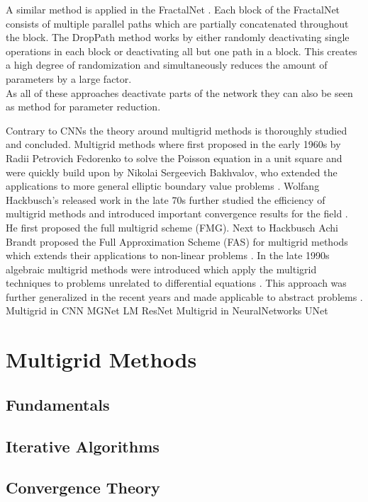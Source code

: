 \documentclass[a4paper,12pt,titlepage,enabledeprecatedfontcommands]{scrreprt}
\begin{document}
A similar method is applied in the FractalNet \cite{DBLP:journals/corr/LarssonMS16a}. Each block of the FractalNet consists of multiple parallel paths which are partially concatenated throughout the block. The DropPath method works by either randomly deactivating single operations in each block or deactivating all but one path in a block. This creates a high degree of randomization and simultaneously reduces the amount of parameters by a large factor. \\
As all of these approaches deactivate parts of the network they can also be seen as method for parameter reduction.

Contrary to CNNs the theory around multigrid methods is thoroughly studied and concluded.
Multigrid methods where first proposed in the early 1960s by Radii Petrovich Fedorenko to solve the Poisson equation in a unit square \cite{FEDORENKO19621092,FEDORENKO1964227} and were quickly build upon by Nikolai Sergeevich Bakhvalov, who extended the applications to more general elliptic boundary value problems \cite{BAKHVALOV1966101}. Wolfang Hackbusch's released work in the late 70s further studied the efficiency of multigrid methods and introduced important convergence results for the field \cite{Hackbusch1977}. He first proposed the full multigrid scheme (FMG). Next to Hackbusch Achi Brandt proposed the Full Approximation Scheme (FAS) for multigrid methods which extends their applications to non-linear problems \cite{Brandt1973,Brandt1977}. In the late 1990s algebraic multigrid methods were introduced which apply the multigrid techniques to problems unrelated to differential equations \cite{stueben1999}. This approach was further generalized in the recent years and made applicable to abstract problems \cite{xu_zikatanov_2017}. \\

Multigrid in CNN
MGNet
LM ResNet
Multigrid in NeuralNetworks
UNet

\chapter{Multigrid Methods}
\section{Fundamentals}
\section{Iterative Algorithms}
\section{Convergence Theory}
\end{document}
